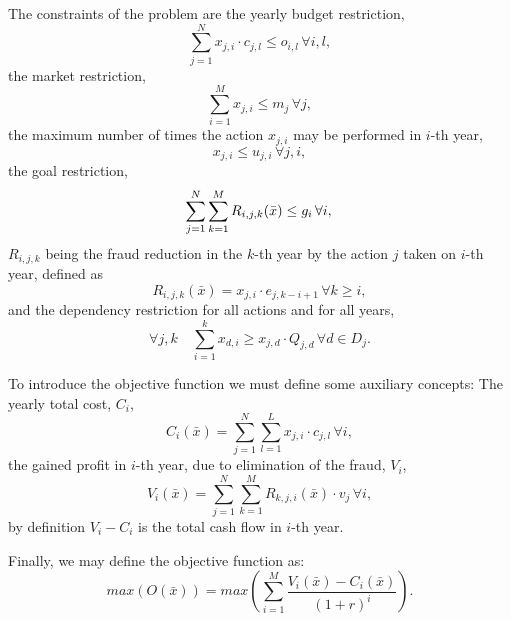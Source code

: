 The constraints of the problem are the yearly budget restriction,
\begin{equation}
    \sum_{j=1}^{N} x_{j, i} \cdot c_{j,l} \le o_{i,l} \, \forall i, l,
	\label{eq:budget}
\end{equation}
the market restriction,
\begin{equation}
     \sum_{i=1}^{M} x_{j, i} \le m_j \, \forall j,
	\label{eq:market}
\end{equation}
the maximum number of times the action $x_{j, i}$ may be performed in $i$-th year,
\begin{equation}
     x_{j, i} \le u_{j, i} \, \forall j, i,
	\label{eq:maxacts}
\end{equation}
the goal restriction,
\begin{equation}
    \label{eq:goal}
    \sum_{j=1}^{N} \sum_{k=1}^{M}R_{i,j,k}(\bar{x}) \leq g_i \, \forall i, \\
\end{equation}
$R_{i,j,k}$ being the fraud reduction in the $k$-th year by the action $j$ taken on $i$-th year, defined as
\begin{equation}
    \label{eq:rec}
    R_{i,j,k}(\bar{x}) = x_{j, i} \cdot e_{j, k - i + 1} \, \forall k \geq i,
\end{equation}
and the dependency restriction for all actions and for all years,
\begin{equation}
    \label{eq:dependency}
    \forall j,k \quad \sum_{i=1}^{k} x_{d, i} \ge x_{j, d} \cdot Q_{j, d} \, \forall d \in D_j.
\end{equation}

To introduce the objective function we must define some auxiliary concepts:
The yearly total cost, $C_i$,
\begin{equation}
\label{eq:cost}
C_{i}(\bar{x}) =  \sum_{j=1}^{N} \sum_{l=1}^{L} x_{j, i} \cdot c_{j,l} \, \forall i,
\end{equation}
the gained profit in $i$-th year, due to elimination of the fraud, $V_i$,
\begin{equation}
    V_{i}(\bar{x}) = \sum_{j=1}^{N} \sum_{k=1}^{M} R_{k, j, i}(\bar{x}) \cdot v_j \, \forall i,
\end{equation}
by definition $V_i - C_i$ is the total cash flow in $i$-th year. 

Finally, we may define the objective function as:
\begin{equation}
    \label{eq:objective}
    max(O(\bar{x})) = max\left(\sum_{i=1}^{M} \frac{V_i(\bar{x}) - C_i(\bar{x})}{(1+r)^i}\right).
\end{equation}

